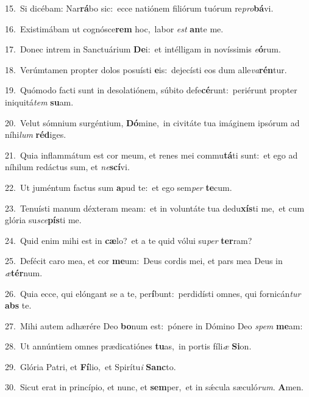 {\numbfont\textcolor{\numbcolor}{15.}}~Si dicébam: Nar\-\textbf{rá}\-bo sic:~\star ecce natiónem filiórum tuórum re\-\textit{pro}\-\textbf{bá}vi.\par
{\numbfont\textcolor{\numbcolor}{16.}}~Existimábam ut cognósce\textbf{rem} hoc,~\star labor \textit{est} \textbf{an}\-te me.\par
{\numbfont\textcolor{\numbcolor}{17.}}~Donec intrem in Sanctuárium \textbf{De}\-i:~\star et intélligam in novíssimis \textit{e}\-\textbf{ó}rum.\par
{\numbfont\textcolor{\numbcolor}{18.}}~Verúmtamen propter dolos posuísti \textbf{e}\-is:~\star dejecísti eos dum alle\-\textit{va}\-\textbf{rén}tur.\par
{\numbfont\textcolor{\numbcolor}{19.}}~Quómodo facti sunt in desolatiónem, súbito defe\-\textbf{cé}\-runt:~\star periérunt propter iniquitá\textit{tem} \textbf{su}\-am.\par
{\numbfont\textcolor{\numbcolor}{20.}}~Velut sómnium surgéntium, \textbf{Dó}\-mine,~\star in civitáte tua imáginem ipsórum ad níhi\textit{lum} \textbf{réd}\-iges.\par
{\numbfont\textcolor{\numbcolor}{21.}}~Quia inflammátum est cor meum, et renes mei commu\-\textbf{tá}\-ti sunt:~\star et ego ad níhilum redáctus sum, et \textit{ne}\-\textbf{scí}vi.\par
{\numbfont\textcolor{\numbcolor}{22.}}~Ut juméntum factus sum \textbf{a}\-pud te:~\star et ego sem\textit{per} \textbf{te}\-cum.\par
{\numbfont\textcolor{\numbcolor}{23.}}~Tenuísti manum déxteram meam:~\dagger et in voluntáte tua dedu\-\textbf{xís}\-ti me,~\star et cum glória su\-\textit{sce}\-\textbf{pís}ti me.\par
{\numbfont\textcolor{\numbcolor}{24.}}~Quid enim mihi est in \textbf{cæ}\-lo?~\star et a te quid vólui su\textit{per} \textbf{ter}\-ram?\par
{\numbfont\textcolor{\numbcolor}{25.}}~Defécit caro mea, et cor \textbf{me}\-um:~\star Deus cordis mei, et pars mea Deus in \textit{æ}\-\textbf{tér}num.\par
{\numbfont\textcolor{\numbcolor}{26.}}~Quia ecce, qui elóngant se a te, per\-\textbf{í}\-bunt:~\star perdidísti omnes, qui fornicán\textit{tur} \textbf{abs} te.\par
{\numbfont\textcolor{\numbcolor}{27.}}~Mihi autem adhærére Deo \textbf{bo}\-num est:~\star pónere in Dómino Deo \textit{spem} \textbf{me}\-am:\par
{\numbfont\textcolor{\numbcolor}{28.}}~Ut annúntiem omnes prædicatiónes \textbf{tu}\-as,~\star in portis fíli\textit{æ} \textbf{Si}\-on.\par
{\numbfont\textcolor{\numbcolor}{29.}}~Glória Patri, et \textbf{Fí}\-lio,~\star et Spirítu\textit{i} \textbf{Sanc}\-to.\par
{\numbfont\textcolor{\numbcolor}{30.}}~Sicut erat in princípio, et nunc, et \textbf{sem}\-per,~\star et in sǽcula sæculó\-\textit{rum}\-. \textbf{A}\-men.\par
